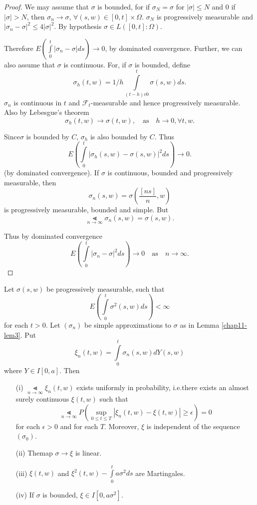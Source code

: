 \begin{proof}
We may assume that $\sigma$ is bounded, for if $\sigma_{N}=\sigma$ for
$|\sigma|\leq N$ and $0$ if $|\sigma|>N$, then $\sigma_{n}\to \sigma$,
$\forall (s,w)\in [0,t]\times\Omega$. $\sigma_{N}$ is progressively
measurable and $|\sigma_{n}-\sigma|^{2}\leq 4|\sigma|^{2}$. By
hypothesis $\sigma\in L([0,t]:\Omega)$.

Therefore $E(\int\limits^{t}_{0}|\sigma_{n}-\sigma|ds)\to 0$, by
dominated convergence. Further, we can also assume that $\sigma$ is
continuous. For, if $\sigma$ is bounded, define
$$
\sigma_{h}(t,w)=1/h\int\limits^{t}_{(t-h)v0}\sigma(s,w)ds.
$$
$\sigma_{n}$ is continuous in $t$ and $\mathscr{F}_{t}$-measurable and
hence progressively measurable. Also by Lebesgue's theorem
$$
\sigma_{h}(t,w)\to \sigma(t,w),\quad\text{as}\quad h\to 0,\forall t,w.
$$

Since\pageoriginale $\sigma$ is bounded by $C$, $\sigma_{h}$ is also
bounded by $C$. Thus
$$
E(\int\limits^{t}_{0}|\sigma_{h}(s,w)-\sigma(s,w)|^{2}ds)\to 0.
$$
(by dominated convergence). If $\sigma$ is continuous, bounded and
progressively measurable, then
$$
\sigma_{n}(s,w)=\sigma\left(\frac{[ns]}{n},w\right)
$$
is progressively measurable, bounded and simple. But
$$
\Lt\limits_{n\to \infty}\sigma_{n}(s,w)=\sigma(s,w).
$$

Thus by dominated convergence
$$
E\left(\int\limits^{t}_{0}|\sigma_{n}-\sigma|^{2}ds\right)\to
0\quad\text{as}\quad n\to \infty.
$$
\end{proof}


\begin{theorem*}
Let $\sigma(s,w)$ be progressively measurable, such that
$$
E(\int\limits^{t}_{0}\sigma^{2}(s,w)ds)<\infty
$$ 
for each $t>0$. Let
$(\sigma_{n})$ be simple approximations to $\sigma$ as in Lemma
\ref{chap11-lem3}. Put
$$
\xi_{n}(t,w)=\int\limits^{t}_{0}\sigma_{n}(s,w)dY(s,w)
$$
where $Y\in I[0,a]$. Then
\begin{itemize}
\item[\rm(i)] $\Lt\limits_{n\to \infty}\xi_{n}(t,w)$ exists uniformly
  in probability, i.e.\@ there exists an almost surely continuous
  $\xi(t,w)$ such that
$$
\Lt\limits_{n\to \infty}P\left(\sup\limits_{0\leq t\leq
  T}|\xi_{n}(t,w)-\xi(t,w)|\geq \epsilon\right)=0
$$
for each $\epsilon>0$ and for each $T$. Moreover, $\xi$ is independent
of the sequence $(\sigma_{0})$.

\item[\rm(ii)] The\pageoriginale map $\sigma\to \xi$ is linear.


\item[\rm(iii)] $\xi(t,w)$ and
  $\xi^{2}(t,w)-\int\limits^{t}_{0}a\sigma^{2}ds$ are Martingales.

\item[\rm(iv)] If $\sigma$ is bounded, $\xi\in I[0,a\sigma^{2}]$.
\end{itemize}
\end{theorem*}

